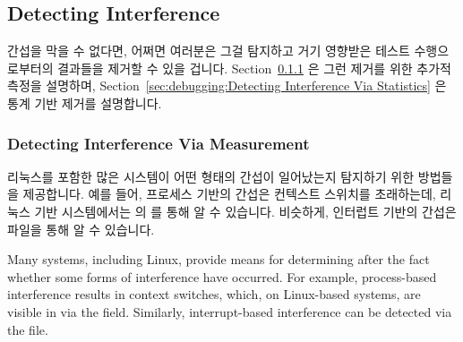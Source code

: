 \fi

\subsection{Detecting Interference}
\label{sec:debugging:Detecting Interference}

간섭을 막을 수 없다면, 어쩌면 여러분은 그걸 탐지하고 거기 영향받은 테스트
수행으로부터의 결과들을 제거할 수 있을 겁니다.
Section~\ref{sec:debugging:Detecting Interference Via Measurement}
은 그런 제거를 위한 추가적 측정을 설명하며,
Section~\ref{sec:debugging:Detecting Interference Via Statistics}
은 통계 기반 제거를 설명합니다.

\subsubsection{Detecting Interference Via Measurement}
\label{sec:debugging:Detecting Interference Via Measurement}


리눅스를 포함한 많은 시스템이 어떤 형태의 간섭이 일어났는지 탐지하기 위한
방법들을 제공합니다.
예를 들어, 프로세스 기반의 간섭은 컨텍스트 스위치를 초래하는데, 리눅스 기반
시스템에서는  의  를 통해 알 수
있습니다.
비슷하게, 인터럽트 기반의 간섭은  파일을 통해 알 수
있습니다.

\iffalse

Many systems, including Linux, provide means for determining after the
fact whether some forms of interference have occurred.
For example, process-based interference results in context switches,
which, on Linux-based systems, are visible in
 via the  field.
Similarly, interrupt-based interference can be detected via the
 file.

